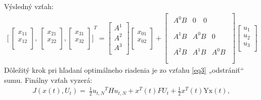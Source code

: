 Výsledný vzťah:
\begin{equation} \label{eq9}
\begin{split}
{\lbrack\ \begin{bmatrix}
x_{11} \\
x_{12} \\
\end{bmatrix},\ \begin{bmatrix}
x_{21} \\
x_{22} \\
\end{bmatrix},\begin{bmatrix}
x_{31} \\
x_{32} \\
\end{bmatrix}\rbrack}^{T} = \begin{bmatrix}
A^{1} \\
A^{2} \\
A^{3} \\
\end{bmatrix}\begin{bmatrix}
x_{01} \\
x_{02} \\
\end{bmatrix} + \begin{bmatrix}
\begin{matrix}
A^{0}B & 0\  & 0 \\
\end{matrix} \\
\begin{matrix}
A^{1}B & A^{0}B & 0 \\
\end{matrix} \\
\begin{matrix}
A^{2}B & A^{1}B & A^{0}B \\
\end{matrix} \\
\end{bmatrix}\begin{bmatrix}
u_{1} \\
u_{2} \\
u_{3} \\
\end{bmatrix}
\end{split}
\end{equation}
Dôležitý krok pri hľadaní optimálneho riadenia je zo vzťahu \ref{eq3}
„odstrániť`` sumu. Finálny vzťah vyzerá:
\begin{equation} \label{eq10}
\begin{split}
J\left( x\left( t \right),U_{t} \right) = \ \frac{1}{2}{u_{t,N}}^{T}Hu_{t,N} + x^{T}\left( t \right)FU_{t} + \frac{1}{2}x^{T}\left( t \right)\text{Yx}\left( t \right),
\end{split}
\end{equation}

